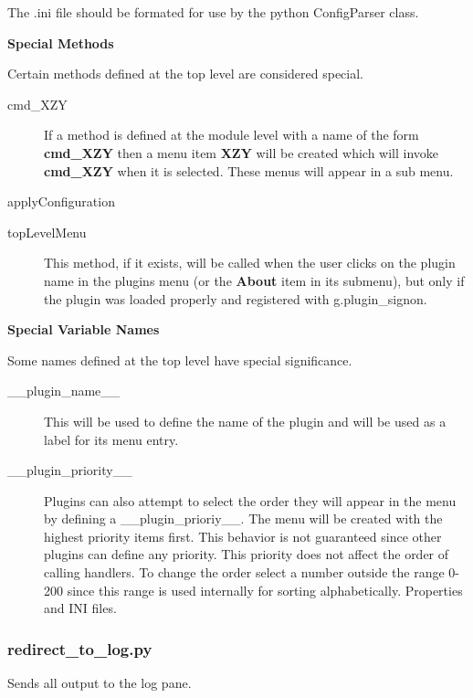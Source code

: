 \documentclass[a4paper,10pt,english]{sphinxmanual}
\begin{document}
The .ini file should be formated for use by the python ConfigParser class.

\textbf{Special Methods}

Certain methods defined at the top level are considered special.
\begin{description}
\item[{cmd\_XZY}] \leavevmode
If a method is defined at the module level with a name of the form
\textbf{cmd\_XZY} then a menu item \textbf{XZY} will be created which will invoke
\textbf{cmd\_XZY} when it is selected. These menus will appear in a sub menu.

\end{description}

applyConfiguration
\begin{description}
\item[{topLevelMenu}] \leavevmode
This method, if it exists, will be called when the user clicks on the plugin
name in the plugins menu (or the \textbf{About} item in its submenu), but only if
the plugin was loaded properly and registered with g.plugin\_signon.

\end{description}

\textbf{Special Variable Names}

Some names defined at the top level have special significance.
\begin{description}
\item[{\_\_plugin\_name\_\_}] \leavevmode
This will be used to define the name of the plugin and will be used
as a label for its menu entry.

\item[{\_\_plugin\_priority\_\_}] \leavevmode
Plugins can also attempt to select the order they will appear in the menu by
defining a \_\_plugin\_prioriy\_\_. The menu will be created with the highest
priority items first. This behavior is not guaranteed since other plugins
can define any priority. This priority does not affect the order of calling
handlers.
To change the order select a number outside the range 0-200 since this range
is used internally for sorting alphabetically. Properties and INI files.

\end{description}


\subsubsection{redirect\_to\_log.py}
\label{plugins:redirect-to-log-py}
Sends all output to the log pane.
\end{document}
